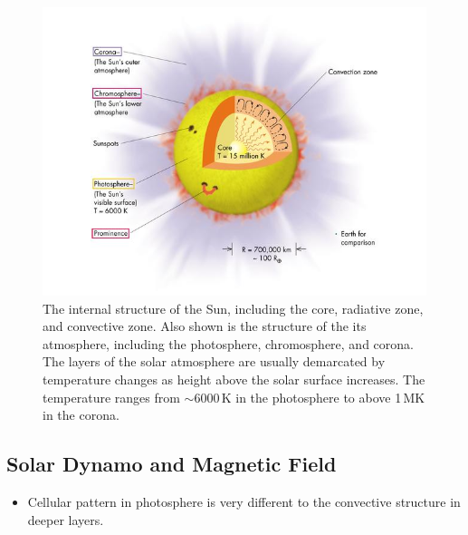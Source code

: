 \begin{figure}[!t]
\begin{center}
\includegraphics[trim = 0cm 0.5cm 0cm 0cm, width=1.0\textwidth]{images/solar_atmosphere}
\caption{The internal structure of the Sun, including the core, radiative zone, and convective zone.  Also shown is the structure of the its atmosphere, including the photosphere, chromosphere, and corona. The layers of the solar atmosphere are usually demarcated by temperature changes as height above the solar surface increases. The temperature ranges from $\sim$6000\,K in the photosphere to above 1\,MK in the corona.}
\label{fig:solar_atmosphere} 
\end{center}
\end{figure}



\subsection{Solar Dynamo and Magnetic Field}\label{sec:11}

\begin{itemize}
\item Cellular pattern in photosphere is very different to the convective structure in deeper layers.
\end{itemize}


